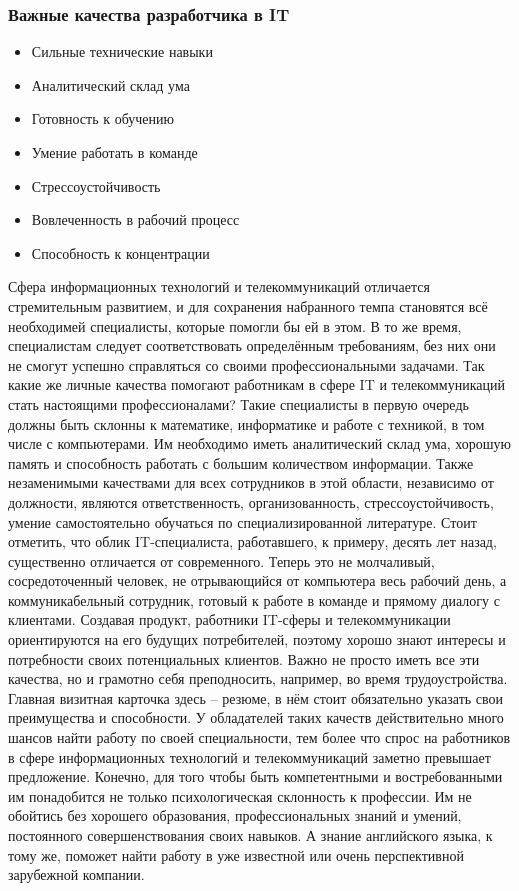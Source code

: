 \documentclass{../industrial-development}
\begin{document}
\begin{frame} \frametitle{Важные качества разработчика в IT}
	 \begin{itemize}
	 	\item Сильные технические навыки
		\item Аналитический склад ума
	 	\item Готовность к обучению
	 	\item Умение работать в команде
		\item Стрессоустойчивость
		\item Вовлеченность в рабочий процесс
		\item Способность к концентрации
	 \end{itemize}
\end{frame}
\lecturenotes
Сфера информационных технологий и телекоммуникаций отличается стремительным развитием, и для сохранения набранного темпа становятся всё необходимей специалисты, которые помогли бы ей в этом. В то же время, специалистам следует соответствовать определённым требованиям, без них они не смогут успешно справляться со своими профессиональными задачами. Так какие же личные качества помогают работникам в сфере IT и телекоммуникаций стать настоящими профессионалами?
Такие специалисты в первую очередь должны быть склонны к математике, информатике и работе с техникой, в том числе с компьютерами. Им необходимо иметь аналитический склад ума, хорошую память и способность работать с большим количеством информации. Также незаменимыми качествами для всех сотрудников в этой области, независимо от должности, являются ответственность, организованность, стрессоустойчивость, умение самостоятельно обучаться по специализированной литературе.
Стоит отметить, что облик IT-специалиста, работавшего, к примеру, десять лет назад, существенно отличается от современного. Теперь это не молчаливый, сосредоточенный человек, не отрывающийся от компьютера весь рабочий день, а коммуникабельный сотрудник, готовый к работе в команде и прямому диалогу с клиентами. Создавая продукт, работники IT-сферы и телекоммуникации ориентируются на его будущих потребителей, поэтому хорошо знают интересы и потребности своих потенциальных клиентов.
Важно не просто иметь все эти качества, но и грамотно себя преподносить, например, во время трудоустройства. Главная визитная карточка здесь – резюме, в нём стоит обязательно указать свои преимущества и способности. 
У обладателей таких качеств действительно много шансов найти работу по своей специальности, тем более что спрос на работников в сфере информационных технологий и телекоммуникаций заметно превышает предложение. Конечно, для того чтобы быть компетентными и востребованными им понадобится не только психологическая склонность к профессии. Им не обойтись без хорошего образования, профессиональных знаний и умений, постоянного совершенствования своих навыков. А знание английского языка, к тому же, поможет найти работу в уже известной или очень перспективной зарубежной компании.
\end{document}
